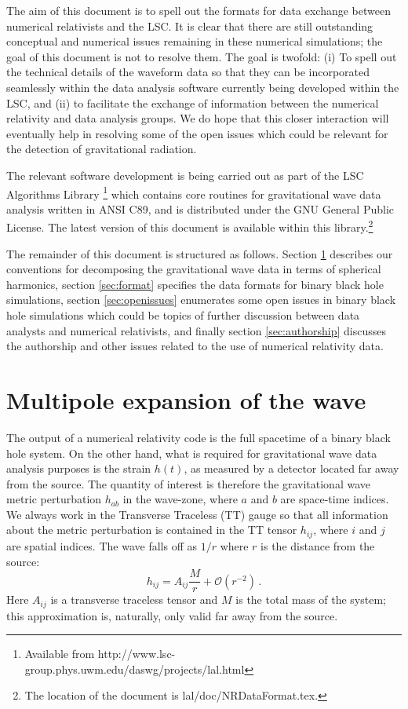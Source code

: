 \documentclass[10pt]{ligodcc}
\renewcommand{\texttt}[1]{{\ttfamily\color{blue}#1}}
\begin{document}
The aim of this document is to spell out the formats for data exchange
between numerical relativists and the LSC.  It is clear that there are
still outstanding conceptual and numerical issues remaining in these
numerical simulations; the goal of this document is not to resolve
them.  The goal is twofold: (i) To spell out the technical details of
the waveform data so that they can be incorporated seamlessly within
the data analysis software currently being developed within the LSC,
and (ii) to facilitate the exchange of information between the
numerical relativity and data analysis groups.  We do hope that this
closer interaction will eventually help in resolving some of the open
issues which could be relevant for the detection of gravitational
radiation.

The relevant software development is being carried out as part of the
LSC Algorithms Library \footnote{Available from
  \texttt{http://www.lsc-group.phys.uwm.edu/daswg/projects/lal.html}}
which contains core routines for gravitational wave data analysis
written in ANSI C89, and is distributed under the GNU General Public
License.  The latest version of this document is available within this
library.\footnote{The location of the document is
  \texttt{lal/doc/NRDataFormat.tex}.}
  
The remainder of this document is structured as follows.  Section
\ref{sec:multipoles} describes our conventions for decomposing the
gravitational wave data in terms of spherical harmonics, section
\ref{sec:format} specifies the data formats for binary black hole
simulations, section \ref{sec:openissues} enumerates some open issues in
binary black hole simulations which could be topics of further
discussion between data analysts and numerical relativists, and finally
section \ref{sec:authorship} discusses the authorship and other issues
related to the use of numerical relativity data.



\section{Multipole expansion of the wave}
\label{sec:multipoles}


The output of a numerical relativity code is the full spacetime of a
binary black hole system. On the other hand, what is required for
gravitational wave data analysis purposes is the strain $h(t)$, as
measured by a detector located far away from the source.  The quantity
of interest is therefore the gravitational wave metric perturbation
$h_{ab}$ in the wave-zone, where $a$ and $b$ are space-time indices.
We always work in the Transverse Traceless (TT) gauge so that all
information about the metric perturbation is contained in the TT
tensor $h_{ij}$, where $i$ and $j$ are spatial indices.  The wave
falls off as $1/r$ where $r$ is the distance from the source:
\begin{equation}
  \label{eq:1}
  h_{ij} = A_{ij}\frac{M}{r} + \mathcal{O}\left(r^{-2}\right)\,.
\end{equation}
Here $A_{ij}$ is a transverse traceless tensor and $M$ is the total
mass of the system; this approximation is, naturally, only valid far
away from the source.
\end{document}
